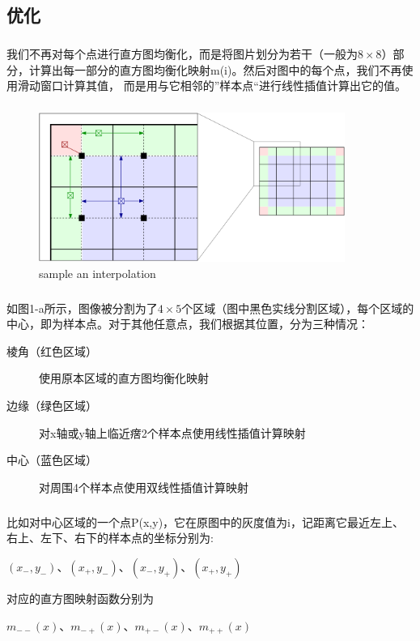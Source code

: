 \documentclass{article}
\begin{document}
        \subsection{优化}
        \subparagraph{}
        我们不再对每个点进行直方图均衡化，而是将图片划分为若干（一般为$8\times 8$）部分，计算出每一部分的直方图均衡化映射m(i)。然后对图中的每个点，我们不再使用滑动窗口计算其值，
        而是用与它相邻的”样本点“进行线性插值计算出它的值。
        \subparagraph{}
        \begin{figure}[htbp!]
                \begin{minipage}[t]{1\linewidth}\centering
                \includegraphics[width=10cm]{ahe-interploation.png}
                \caption{sample an interpolation}\label{1-a}
                \end{minipage}
        \end{figure}
        \subparagraph{}
        如图1-a所示，图像被分割为了$4\times 5$个区域（图中黑色实线分割区域），每个区域的中心，即为样本点。对于其他任意点，我们根据其位置，分为三种情况：\\
        \begin{description}
          \item[棱角（红色区域）] 使用原本区域的直方图均衡化映射
          \item[边缘（绿色区域）] 对x轴或y轴上临近瘔2个样本点使用线性插值计算映射
          \item[中心（蓝色区域）] 对周围4个样本点使用双线性插值计算映射
        \end{description}
        \subparagraph{}
        比如对中心区域的一个点P(x,y)，它在原图中的灰度值为i，记距离它最近左上、右上、左下、右下的样本点的坐标分别为:\\
        \begin{center}
          $(x_{-},y_{-})$、$(x_{+},y_{-})$、$(x_{-},y_{+})$、$(x_{+},y_{+})$\\
        \end{center}
        对应的直方图映射函数分别为\\
        \begin{center}
        $m_{--}(x)$、$m_{-+}(x)$、$m_{+-}(x)$、$m_{++}(x)$\\
        \end{center}
\end{document}
